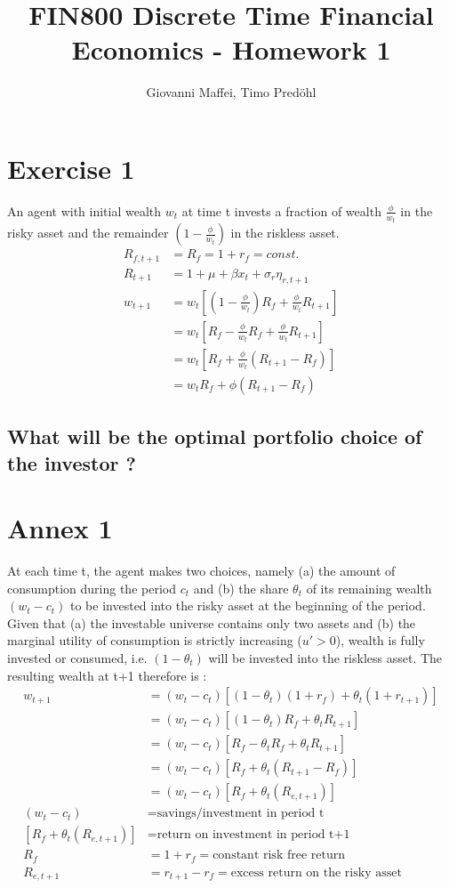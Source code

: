 \documentclass[]{article}
\title{FIN800 Discrete Time Financial Economics - Homework 1}
\author{Giovanni Maffei, Timo Predöhl}
\begin{document}
\maketitle

\section{Exercise 1}
An agent with initial wealth $w_t$ at time t invests a fraction of wealth $\frac{\phi}{w_t}$ in the risky asset and the remainder $(1-\frac{\phi}{w_t})$ in the riskless asset.
\begin{align*}
	R_{f,t+1} &= R_{f} = 1+r_f = const.\\
	R_{t+1} &= 1 + \mu + \beta x_t + \sigma_r \eta_{r, t+1}\\
	w_{t+1} &= w_t[(1-\frac{\phi}{w_t})R_f+\frac{\phi}{w_t} R_{t+1}]\\
	&= w_t[R_f - \frac{\phi}{w_t} R_f + \frac{\phi}{w_t} R_{t+1}]\\
	&= w_t[R_f + \frac{\phi}{w_t} (R_{t+1} - R_f)]\\
	&= w_t R_f + \phi (R_{t+1} - R_f)
\end{align*}


\subsection{What will be the optimal portfolio choice of the investor ?}


\section{Annex 1}
At each time t, the agent makes two choices, namely (a) the amount of consumption during the period $c_t$ and (b) the share $\theta_t$ of its remaining wealth $(w_t - c_t)$ to be invested into the risky asset at the beginning of the period. Given that (a) the investable universe contains only two assets and (b) the marginal utility of consumption is strictly increasing ($u'>0$), wealth is fully invested or consumed, i.e. $(1-\theta_t)$ will be invested into the riskless asset. The resulting wealth at t+1 therefore is :
\begin{align*}
	w_{t+1} &= (w_t - c_t)\left[(1-\theta_t)(1+r_f)+ \theta_t(1+r_{t+1}) \right]\\
	&= (w_t - c_t)[(1-\theta_t)R_f + \theta_t R_{t+1}]\\
	&= (w_t - c_t)[R_f-\theta_t R_f + \theta_t R_{t+1}]\\
	&= (w_t - c_t)[R_f + \theta_t (R_{t+1} - R_f) ]\\
	&= (w_t - c_t)[R_f + \theta_t (R_{e, t+1})]\\
	(w_t - c_t) &= \text{savings/investment in period t}\\
	[R_f + \theta_t (R_{e, t+1}) ] &= \text{return on investment in period t+1}\\
	R_f &= 1+r_f = \text{constant risk free return}\\
	R_{e, t+1} &= r_{t+1} - r_f = \text{excess return on the risky asset}
\end{align*}
\end{document}
